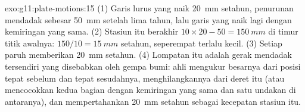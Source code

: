 \begin{solution}{exo:g11:plate-motions:15}
(1) Garis lurus yang naik \qty{20}{mm} setahun, penurunan mendadak sebesar
\qty{50}{mm} setelah lima tahun, lalu garis yang naik lagi dengan kemiringan
yang sama. (2) Stasiun itu berakhir $10 \times 20 - 50 = \qty{150}{mm}$ di timur
titik awalnya: $150/10 = \qty{15}{mm}$ setahun, seperempat terlalu kecil.
(3) Setiap paruh memberikan \qty{20}{mm} setahun. (4) Lompatan itu adalah gerak
mendadak tersendiri yang disebabkan oleh gempa bumi: ahli  mengukur
besarnya dari posisi tepat sebelum dan tepat sesudahnya, menghilangkannya dari
deret itu (atau mencocokkan kedua bagian dengan kemiringan yang sama dan satu
undakan di antaranya), dan mempertahankan \qty{20}{mm} setahun sebagai kecepatan
stasiun itu.
\end{solution}

